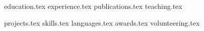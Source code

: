 \documentclass[letterpaper,11pt]{article}
\begin{document}

{education.tex}
{experience.tex}
{publications.tex}
{teaching.tex}

\pagebreak

{projects.tex}
\sidebyside
    {{skills.tex}}
    {{languages.tex}}
{awards.tex}
{volunteering.tex}
\end{document}
